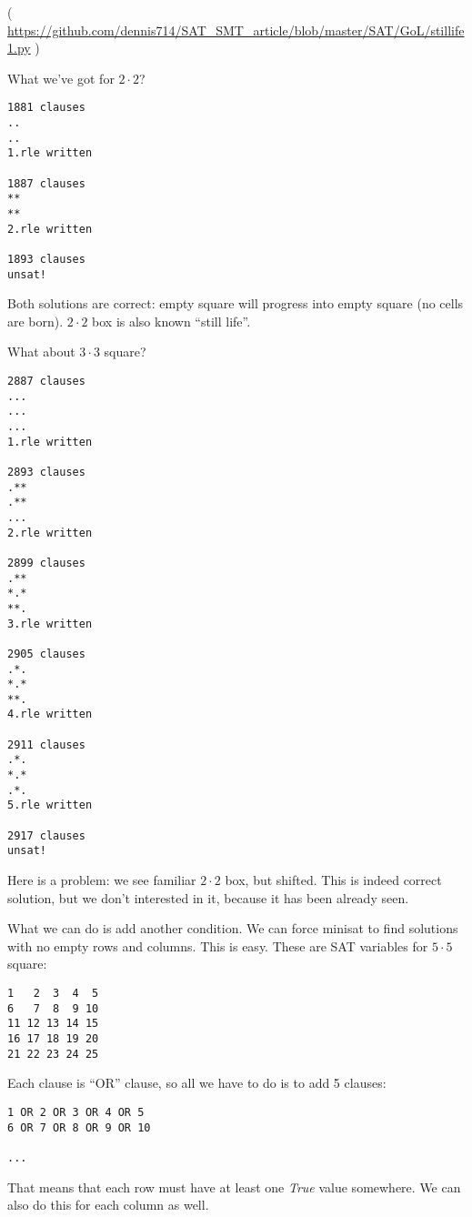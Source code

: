 

( \url{https://github.com/dennis714/SAT_SMT_article/blob/master/SAT/GoL/stillife1.py} )

What we've got for $2 \cdot 2$?

\begin{lstlisting}
1881 clauses
..
..
1.rle written

1887 clauses
**
**
2.rle written

1893 clauses
unsat!
\end{lstlisting}

Both solutions are correct: empty square will progress into empty square (no cells are born).
$2 \cdot 2$ box is also known ``still life''.

What about $3 \cdot 3$ square?

\begin{lstlisting}
2887 clauses
...
...
...
1.rle written

2893 clauses
.**
.**
...
2.rle written

2899 clauses
.**
*.*
**.
3.rle written

2905 clauses
.*.
*.*
**.
4.rle written

2911 clauses
.*.
*.*
.*.
5.rle written

2917 clauses
unsat!
\end{lstlisting}

Here is a problem: we see familiar $2 \cdot 2$ box, but shifted.
This is indeed correct solution, but we don't interested in it, because it has been already seen.

What we can do is add another condition. We can force minisat to find solutions with no empty rows and columns.
This is easy.
These are SAT variables for $5 \cdot 5$ square:

\begin{lstlisting}
1   2  3  4  5
6   7  8  9 10
11 12 13 14 15
16 17 18 19 20
21 22 23 24 25
\end{lstlisting}

Each clause is ``OR'' clause, so all we have to do is to add 5 clauses:

\begin{lstlisting}
1 OR 2 OR 3 OR 4 OR 5
6 OR 7 OR 8 OR 9 OR 10

...

\end{lstlisting}

That means that each row must have at least one \textit{True} value somewhere.
We can also do this for each column as well.


